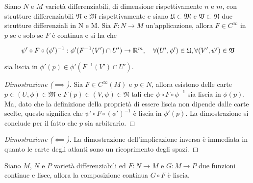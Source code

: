 \begin{definition}
	Siano $ N $ e $ M $ varietà differenziabili, di dimensione rispettivamente $ n $ e $ m $, con strutture differenziabili $ \mathfrak{N} $ e $ \mathfrak{M} $ rispettivamente e siano $ \mathfrak{U} \subset \mathfrak{M} $ e $ \mathfrak{V} \subset \mathfrak{N} $ due strutture differenziali in N e M. Sia $ F : N \to M $ un'applicazione, allora $ F \in C^{\infty} $ in $ p $ se e solo se $ F $ è continua e si ha che
	
	\begin{equation}
		\psi' \circ F \circ (\phi')^{-1} : \phi'(F^{-1}(V') \cap U') \to \R^{m} \qcomma \forall (U',\phi') \in \mathfrak{U}, \forall (V',\psi') \in \mathfrak{V}
	\end{equation}

	sia liscia in $ \phi'(p) \in \phi'(F^{-1}(V') \cap U') $.
\end{definition}

\begin{proof}[Dimostrazione ($ \implies $)]
	Sia $ F \in C^{\infty}(M) $ e $ p \in N $, allora esistono delle carte $ p \in (U,\phi) \in \mathfrak{M} $ e $ F(p) \in (V,\psi) \in \mathfrak{N} $ tali che $ \psi \circ F \circ \phi^{-1} $ sia liscia in $ \phi(p) $. Ma, dato che la definizione della proprietà di essere liscia non dipende dalle carte scelte, questo significa che $ \psi' \circ F \circ (\phi')^{-1} $ è liscia in $ \phi'(p) $. La dimostrazione si conclude per il fatto che $ p $ sia arbitrario.
\end{proof}

\begin{proof}[Dimostrazione ($ \impliedby $)]
	La dimostrazione dell'implicazione inversa è immediata in quanto le carte degli atlanti sono un ricoprimento degli spazi.
\end{proof}

\begin{definition}
	Siano $ M $, $ N $ e $ P $ varietà differenziabili ed $ F : N \to M $ e $ G : M \to P $ due funzioni continue e lisce, allora la composizione continua $ G \circ F $ è liscia.
\end{definition}

